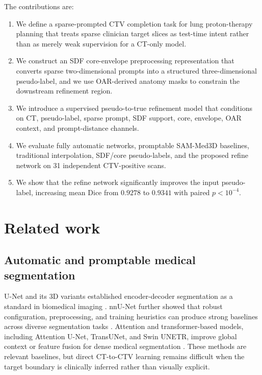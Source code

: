 \documentclass[preprint,12pt]{elsarticle}
\begin{document}
The contributions are:
\begin{enumerate}
  \item We define a sparse-prompted CTV completion task for lung proton-therapy planning that treats sparse clinician target slices as test-time intent rather than as merely weak supervision for a CT-only model.
  \item We construct an SDF core-envelope preprocessing representation that converts sparse two-dimensional prompts into a structured three-dimensional pseudo-label, and we use OAR-derived anatomy masks to constrain the downstream refinement region.
  \item We introduce a supervised pseudo-to-true refinement model that conditions on CT, pseudo-label, sparse prompt, SDF support, core, envelope, OAR context, and prompt-distance channels.
  \item We evaluate fully automatic networks, promptable SAM-Med3D baselines, traditional interpolation, SDF/core pseudo-labels, and the proposed refine network on 31 independent CTV-positive scans.
  \item We show that the refine network significantly improves the input pseudo-label, increasing mean Dice from $0.9278$ to $0.9341$ with paired $p<10^{-4}$.
\end{enumerate}

\section{Related work}

\subsection{Automatic and promptable medical segmentation}

U-Net and its 3D variants established encoder-decoder segmentation as a standard in biomedical imaging \cite{ronneberger2015unet,cicek2016threedunet,milletari2016vnet}. nnU-Net further showed that robust configuration, preprocessing, and training heuristics can produce strong baselines across diverse segmentation tasks \cite{isensee2021nnunet}. Attention and transformer-based models, including Attention U-Net, TransUNet, and Swin UNETR, improve global context or feature fusion for dense medical segmentation \cite{oktay2018attentionunet,chen2021transunet,tang2021swinunetr}. These methods are relevant baselines, but direct CT-to-CTV learning remains difficult when the target boundary is clinically inferred rather than visually explicit.
\end{document}
